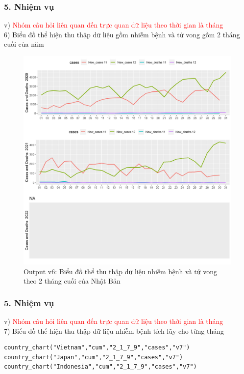 \documentclass[english,10pt,table]{beamer}
\begin{document}
\begin{frame}[fragile]
\frametitle{5.  Nhiệm vụ}
v) \textcolor{red}{Nhóm câu hỏi liên quan đến trực quan dữ liệu theo thời gian là tháng}\\
    6) Biểu đồ thể hiện thu thập dữ liệu gồm nhiễm bệnh và tử vong gồm 2 tháng cuối của năm
	\begin{figure}[h!]
	\begin{center}
		    \includegraphics[scale = 0.25]{Images/V/v6 Japan .jpeg}
		     \caption{Output v6: Biểu đồ thể thu thập dữ liệu nhiễm bệnh và tử vong theo 2 tháng cuối của Nhật Bản}
		\end{center}
		\end{figure}
\end{frame}

\begin{frame}[fragile]
\frametitle{5.  Nhiệm vụ}
v) \textcolor{red}{Nhóm câu hỏi liên quan đến trực quan dữ liệu theo thời gian là tháng}\\
    7) Biểu đồ thể hiện thu thập dữ liệu nhiễm bệnh tích lũy cho từng tháng
    \begin{lstlisting}[frame=single,basicstyle=\tiny]  
country_chart("Vietnam","cum","2_1_7_9","cases","v7")
country_chart("Japan","cum","2_1_7_9","cases","v7")
country_chart("Indonesia","cum","2_1_7_9","cases","v7")
		\end{lstlisting}
\end{frame}
\end{document}
